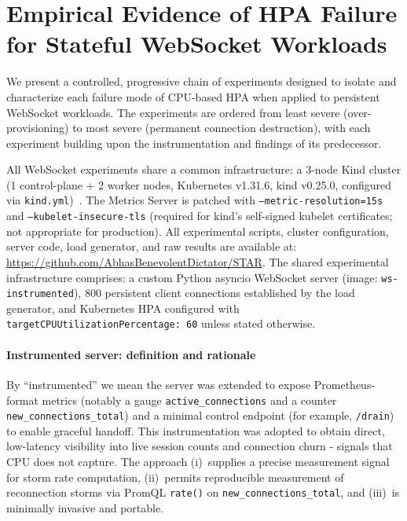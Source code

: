 \documentclass[twocolumn]{svjour3}
\begin{document}
\section{Empirical Evidence of HPA Failure for Stateful WebSocket Workloads}
\label{sec:problem}

We present a controlled, progressive chain of experiments designed to isolate and characterize
each failure mode of CPU-based HPA when applied to persistent WebSocket workloads. The
experiments are ordered from least severe (over-provisioning) to most severe (permanent
connection destruction), with each experiment building upon the instrumentation and findings
of its predecessor.

All WebSocket experiments share a common infrastructure: a 3-node Kind cluster (1
control-plane + 2 worker nodes, Kubernetes v1.31.6, kind v0.25.0, configured via
\texttt{kind.yml})~\cite{kind_docs}. The Metrics Server is patched with
\texttt{--metric-resolution=15s} and \texttt{--kubelet-insecure-tls} (required for kind's
self-signed kubelet certificates; not appropriate for production). All experimental scripts,
cluster configuration, server code, load generator, and raw results are available at:
\url{https://github.com/AbhasBenevolentDictator/STAR}. The shared experimental infrastructure
comprises: a custom Python asyncio WebSocket server (image: \texttt{ws-instrumented}), 800
persistent client connections established by the load generator, and Kubernetes HPA configured
with \texttt{targetCPUUtilizationPercentage: 60} unless stated otherwise.

\paragraph{Instrumented server: definition and rationale}
By ``instrumented'' we mean the server was extended to expose Prometheus-format metrics
(notably a gauge \texttt{active\_connections} and a counter \texttt{new\_connections\_total})
and a minimal control endpoint (for example, \texttt{/drain}) to enable graceful handoff.
This instrumentation was adopted to obtain direct, low-latency visibility into live session
counts and connection churn - signals that CPU does not capture. The approach (i)~supplies
a precise measurement signal for storm rate computation, (ii)~permits reproducible measurement
of reconnection storms via PromQL \texttt{rate()} on \texttt{new\_connections\_total}, and
(iii)~is minimally invasive and portable.
\end{document}
